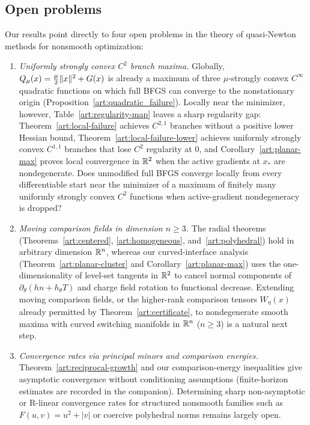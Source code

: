 \subsection{Open problems}

Our results point directly to four open problems in the theory of quasi-Newton
methods for nonsmooth optimization:
\begin{enumerate}
\item \emph{Uniformly strongly convex $C^2$ branch maxima.} Globally,
$Q_\mu(x)=\tfrac\mu2\lVert x\rVert^2+G(x)$ is already a maximum of three $\mu$-strongly
convex $C^\infty$ quadratic functions on which full BFGS can converge to the
nonstationary origin (Proposition~\ref{art:quadratic_failure}). Locally near the
minimizer, however, Table~\ref{art:regularity-map} leaves a sharp regularity
gap: Theorem~\ref{art:local-failure} achieves $C^{2,1}$ branches without a
positive lower Hessian bound, Theorem~\ref{art:local-failure-lower} achieves
uniformly strongly convex $C^{1,1}$ branches that lose $C^2$ regularity at $0$,
and Corollary~\ref{art:planar-max} proves local convergence in $\mathbb R^2$ when the
active gradients at $x_*$ are nondegenerate. Does unmodified full BFGS converge
locally from every differentiable start near the minimizer of a maximum of
finitely many uniformly strongly convex $C^2$ functions when active-gradient
nondegeneracy is dropped?
\item \emph{Moving comparison fields in dimension $n\ge3$.} The radial theorems
(Theorems~\ref{art:centered}, \ref{art:homogeneous}, and~\ref{art:polyhedral})
hold in arbitrary dimension $\mathbb R^n$, whereas our curved-interface analysis
(Theorem~\ref{art:planar-cluster} and Corollary~\ref{art:planar-max}) uses the
one-dimensionality of level-set tangents in $\mathbb R^2$ to cancel normal components
of $\partial_\theta(hn+h_\theta T)$ and charge field rotation to functional
decrease. Extending moving comparison fields, or the higher-rank comparison tensors
$W_\eta(x)$ already permitted by Theorem~\ref{art:certificate}, to nondegenerate
smooth maxima with curved switching manifolds in $\mathbb R^n$ ($n\ge3$) is a natural
next step.
\item \emph{Convergence rates via principal minors and comparison energies.}
Theorem~\ref{art:reciprocal-growth} and our comparison-energy inequalities give
asymptotic convergence without conditioning assumptions (finite-horizon
estimates are recorded in the companion). Determining sharp non-asymptotic or
R-linear convergence rates for structured nonsmooth families such as
$F(u,v)=u^2+|v|$ or coercive polyhedral norms remains largely open.

\end{enumerate}
